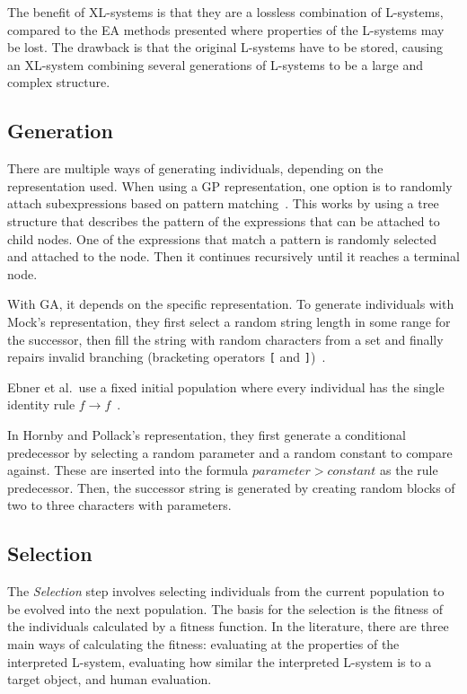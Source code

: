 The benefit of XL-systems is that they are a lossless combination of L-systems, compared to the EA methods presented where properties of the L-systems may be lost.
The drawback is that the original L-systems have to be stored, causing an XL-system combining several generations of L-systems to be a large and complex structure.

\subsection{Generation}
There are multiple ways of generating individuals, depending on the representation used.
When using a GP representation, one option is to randomly attach subexpressions based on pattern matching~\cite{1994Jacob}.
This works by using a tree structure that describes the pattern of the expressions that can be attached to child nodes. One of the expressions that match a pattern is randomly selected and attached to the node. Then it continues recursively until it reaches a terminal node.

With GA, it depends on the specific representation.
To generate individuals with Mock's representation, they first select a random string length in some range for the successor, then fill the string with random characters from a set and finally repairs invalid branching (bracketing operators \texttt{[} and \texttt{]})~\cite{1998Mock}.

Ebner et al.\ use a fixed initial population where every individual has the single identity rule $f\rightarrow f$~\cite{2002Ebner}.

In Hornby and Pollack's representation, they first generate a conditional predecessor by selecting a random parameter and a random constant to compare against.
These are inserted into the formula $parameter > constant$ as the rule predecessor.
Then, the successor string is generated by creating random blocks of two to three characters with parameters.~\cite{2001Hornby}

\subsection{Selection}
The \textit{Selection} step involves selecting individuals from the current population to be evolved into the next population.
The basis for the selection is the fitness of the individuals calculated by a fitness function.
In the literature, there are three main ways of calculating the fitness: evaluating at the properties of the interpreted L-system, evaluating how similar the interpreted L-system is to a target object, and human evaluation.

